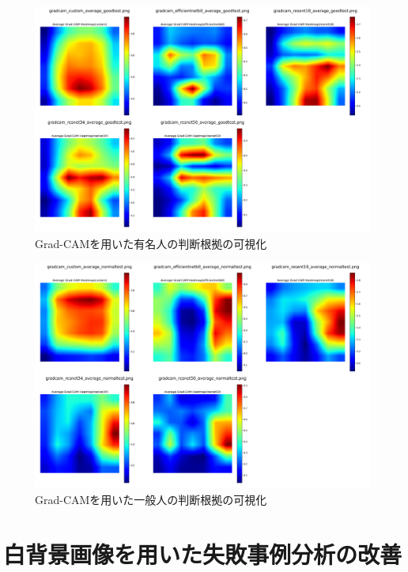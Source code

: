 \documentclass[a4paper,11pt,titlepage]{jsarticle}
\begin{document}
	
\begin{figure}[htbp]
    \centering
    \includegraphics[width=1.1\textwidth]{combined_images_good.png}
    \caption{Grad-CAMを用いた有名人の判断根拠の可視化}
    \label{fig:gradcam_good}
\end{figure}
\begin{figure}[H]
    \centering
    \includegraphics[width=1.1\textwidth]{combined_images_normal.png}
    \caption{Grad-CAMを用いた一般人の判断根拠の可視化}
    \label{fig:gradcam_normal}
\end{figure}






\section{白背景画像を用いた失敗事例分析の改善}
\end{document}
